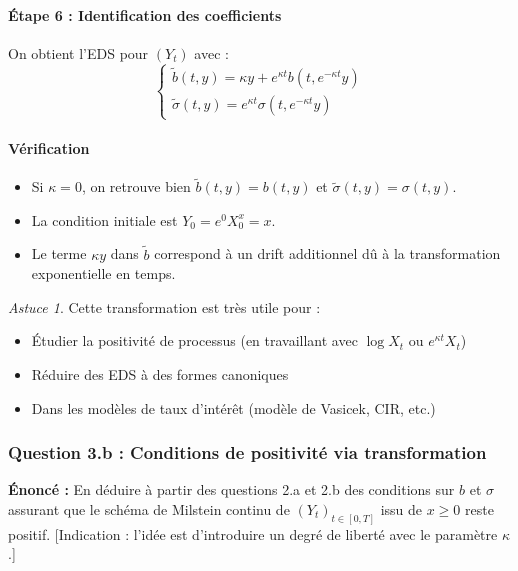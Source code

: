 \documentclass[12pt,a4paper]{article}
\theoremstyle{definition}
\theoremstyle{remark}
\newtheorem*{astuce}{Astuce}
\begin{document}
\paragraph{Étape 6 : Identification des coefficients}
On obtient l'EDS pour $(Y_t)$ avec :
\begin{equation}
\boxed{
\begin{cases}
\tilde{b}(t,y) = \kappa y + e^{\kappa t}b(t, e^{-\kappa t}y) \\
\tilde{\sigma}(t,y) = e^{\kappa t}\sigma(t, e^{-\kappa t}y)
\end{cases}
}
\end{equation}

\paragraph{Vérification}
\begin{itemize}
\item Si $\kappa = 0$, on retrouve bien $\tilde{b}(t,y) = b(t,y)$ et $\tilde{\sigma}(t,y) = \sigma(t,y)$.
\item La condition initiale est $Y_0 = e^{0}X_0^x = x$.
\item Le terme $\kappa y$ dans $\tilde{b}$ correspond à un drift additionnel dû à la transformation exponentielle en temps.
\end{itemize}

\begin{astuce}
Cette transformation est très utile pour :
\begin{itemize}
\item Étudier la positivité de processus (en travaillant avec $\log X_t$ ou $e^{\kappa t}X_t$)
\item Réduire des EDS à des formes canoniques
\item Dans les modèles de taux d'intérêt (modèle de Vasicek, CIR, etc.)
\end{itemize}
\end{astuce}

\subsubsection{Question 3.b : Conditions de positivité via transformation}

\textbf{Énoncé :} En déduire à partir des questions 2.a et 2.b des conditions sur $b$ et $\sigma$ assurant que le schéma de Milstein continu de $(Y_t)_{t \in [0,T]}$ issu de $x \geq 0$ reste positif. [Indication : l'idée est d'introduire un degré de liberté avec le paramètre $\kappa$.]
\end{document}
